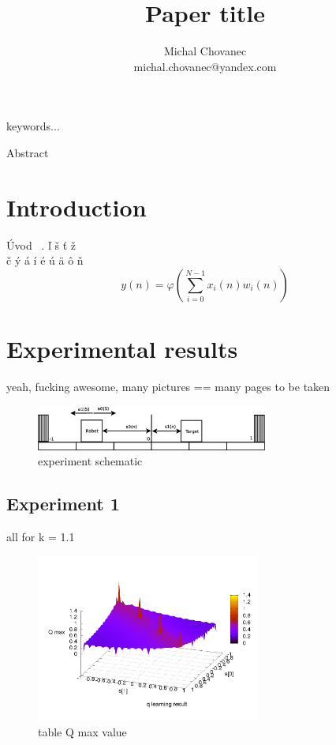 \documentclass[10pt,a5paper]{article}
\begin{document}
\title{Paper title}
\author{Michal Chovanec\\
michal.chovanec@yandex.com}
\date{}
\maketitle
\thispagestyle{empty}


 keywords...

 Abstract

\section{Introduction}

Úvod ~\cite{bib:Aproximation}.
ľ š ť ž  \\
č ý á í é ú ä ô ň \\

\begin{equation}
\label{McCulloch_Pitts}
  y(n) = \varphi(\sum_{i = 0}^{N-1} x_i(n)w_i(n))
\end{equation}


\section{Experimental results}

yeah, fucking awesome, many pictures == many pages to be taken

\begin{figure}[!ht]
\centering
\includegraphics[width=3.0in]{q_learning_test/pictures/1D_robot_diagram.eps}
\caption{experiment schematic}
\label{experiment schematic}
\end{figure}

\subsection{Experiment 1}

all for k = 1.1

\begin{figure}[!ht]
\centering
\includegraphics[width=2.9in]{q_learning_test/experiment_01/table/q_map.png}
\caption{table Q max value}
\label{table Q max value}
\end{figure}
\end{document}
